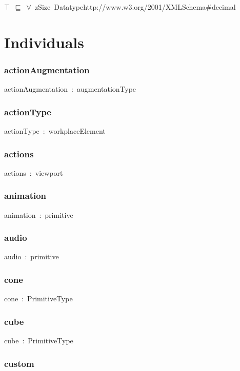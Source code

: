 \documentclass{article}
\begin{document}
\ensuremath{\top}~\ensuremath{\sqsubseteq}~\ensuremath{\forall}~zSize~Datatypehttp://www.w3.org/2001/XMLSchema#decimal

\section*{Individuals}\subsubsection*{actionAugmentation}

actionAugmentation~:~augmentationType

\subsubsection*{actionType}

actionType~:~workplaceElement

\subsubsection*{actions}

actions~:~viewport

\subsubsection*{animation}

animation~:~primitive

\subsubsection*{audio}

audio~:~primitive

\subsubsection*{cone}

cone~:~PrimitiveType

\subsubsection*{cube}

cube~:~PrimitiveType

\subsubsection*{custom}
\end{document}
